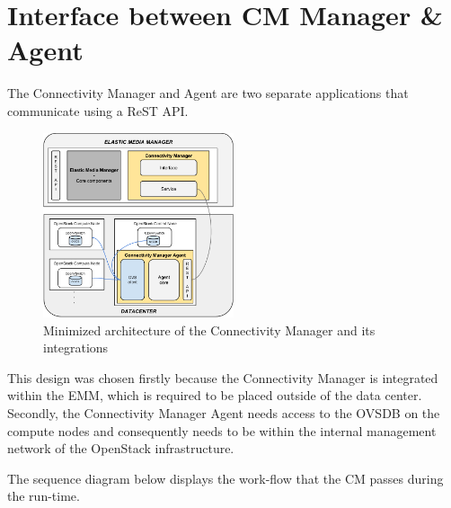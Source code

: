 \section{Interface between CM Manager \& Agent}

The Connectivity Manager and Agent are two separate applications that communicate using a ReST API. 

\begin{figure}[H]
\centering

\includegraphics[width=0.5\textwidth]{images/design/modular_architecture_cm_cma}

\caption{Minimized architecture of the Connectivity Manager and its integrations}
\end{figure}

This design was chosen firstly because the Connectivity Manager is integrated within the EMM, which is required to be placed outside of the data center. Secondly, the Connectivity Manager Agent needs access to the OVSDB on the compute nodes and consequently needs to be within the internal management network of the OpenStack infrastructure.

The sequence diagram below displays the work-flow that the CM passes during the run-time.

